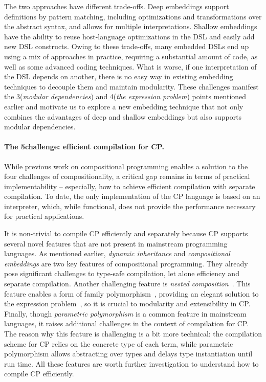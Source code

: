 The two approaches have different trade-offs. Deep embeddings support
definitions by pattern matching, including optimizations and transformations
over the abstract syntax, and allows for multiple interpretations. Shallow
embeddings have the ability to reuse host-language optimizations in the DSL and
easily add new DSL constructs. Owing to these trade-offs, many embedded DSLs end
up using a mix of approaches in practice, requiring a substantial amount of
code, as well as some advanced coding techniques. What is worse, if one
interpretation of the DSL depends on another, there is no easy way in existing
embedding techniques to decouple them and maintain modularity. These challenges
manifest the 3\rd (\emph{modular dependencies}) and 4\th (\emph{the expression
problem}) points mentioned earlier and motivate us to explore a new embedding
technique that not only combines the advantages of deep and shallow embeddings
but also supports modular dependencies.

\paragraph{The 5\th challenge: efficient compilation for CP.}
While previous work on compositional programming enables a solution to the four
challenges of compositionality, a critical gap remains in terms of practical
implementability -- especially, how to achieve efficient compilation with
separate compilation. To date, the only implementation of the CP language is
based on an interpreter, which, while functional, does not provide the
performance necessary for practical applications.

It is non-trivial to compile CP efficiently and separately because CP supports
several novel features that are not present in mainstream programming languages.
As mentioned earlier, \emph{dynamic inheritance} and \emph{compositional
embeddings} are two key features of compositional programming. They already pose
significant challenges to type-safe compilation, let alone efficiency and
separate compilation. Another challenging feature is \emph{nested
composition}~\citep{bi2018essence}. This feature enables a form of family
polymorphism~\citep{ernst2001family}, providing an elegant solution to the
expression problem~\citep{ernst2004expression}, so it is crucial to modularity
and extensibility in CP. Finally, though \emph{parametric polymorphism} is a
common feature in mainstream languages, it raises additional challenges in the
context of compilation for CP. The reason why this feature is challenging is a
bit more technical: the compilation scheme for CP relies on the concrete type of
each term, while parametric polymorphism allows abstracting over types and
delays type instantiation until run time. All these features are worth further
investigation to understand how to compile CP efficiently.

